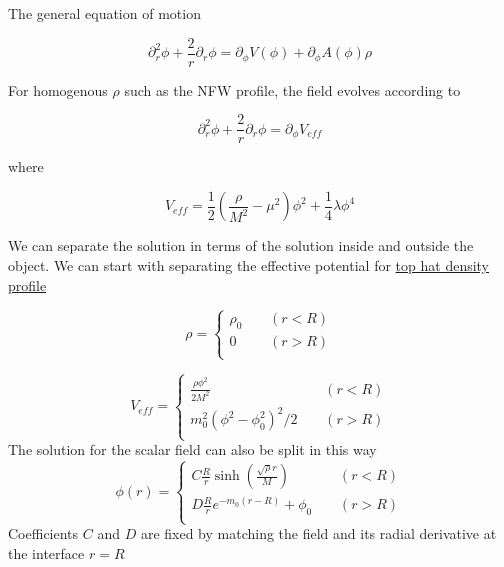 \documentclass[aps,showpacs,onecolumn,floats,prd,superscriptaddress,nofootinbib]{revtex4-1}
\begin{document}
The general equation of motion 

\begin{equation}
	\partial_r^2 \phi + \frac{2}{r} \partial_r \phi = \partial_\phi V(\phi) + \partial_\phi A(\phi) \rho
\end{equation}

For homogenous $\rho$ such as the NFW profile, the field evolves according to 

\begin{equation}
	\partial_r^2 \phi + \frac{2}{r} \partial_r \phi = \partial_\phi V_{eff}
\end{equation}

where 

\begin{equation}
	V_{eff} = \frac{1}{2} \left( \frac{\rho}{M^2} - \mu^2 \right) \phi^2 + \frac{1}{4} \lambda \phi^4
\end{equation}

We can separate the solution in terms of the solution inside and outside the object. We can start with separating the effective potential for \underline{top hat density profile}

\begin{equation}
	\rho=\begin{cases} \rho_0 & \ \ \ \ \ (r<R) \\
	0 & \ \ \ \ \ (r>R) \\
	\end{cases}
\end{equation}
	
\begin{equation}
V_{eff}= \begin{cases}
 \frac{\rho \phi^2}{2M^2} &\ \ \ \ \ (r<R)\\
m_0^2 (\phi^2-\phi_0^2)^2/2  & \ \ \ \ \ (r>R)	\\
\end{cases}
\end{equation}
The solution for the scalar field can also be split in this way
\begin{equation}
\phi(r)= \begin{cases}
 C \frac{R}{r} \sinh\left( \frac{\sqrt{\rho}r}{M} \right) &\ \ \ \ \ (r<R)\\
D \frac{R}{r} e^{-m_0(r-R)} + \phi_0 & \ \ \ \ \ (r>R)	\\
\end{cases}
\end{equation}
Coefficients $C$ and $D$ are fixed by matching the field and its radial derivative at the interface $r=R$
\end{document}
